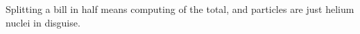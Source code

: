 \documentclass{article}
\begin{document}
Splitting a bill in half means computing  of the total, and
\alpha particles are just helium nuclei in disguise.
\end{document}
